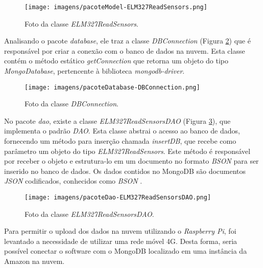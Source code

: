 \begin{figure}[!ht]
\centering
\caption{Foto da classe \textit{ELM327ReadSensors}.} 
{\texttt{[image: imagens/pacoteModel-ELM327ReadSensors.png]}}\\
 \label{Fig:elm327_read_sensors}
\end{figure}

Analisando o pacote \textit{database}, ele traz a classe \textit{DBConnection} (Figura \ref{Fig:db_connection}) que é responsável por criar a conexão com o banco de dados na nuvem. Esta classe contém o método estático \textit{getConnection} que retorna um objeto do tipo \textit{MongoDatabase}, pertencente à biblioteca \textit{mongodb-driver}.

\begin{figure}[!ht]
\centering
\caption{Foto da classe \textit{DBConnection}.} 
{\texttt{[image: imagens/pacoteDatabase-DBConnection.png]}}\\
 \label{Fig:db_connection}
\end{figure}

No pacote \textit{dao}, existe a classe \textit{ELM327ReadSensorsDAO} (Figura \ref{Fig:elm327_read_sensors_dao}), que implementa o padrão \textit{DAO}. Esta classe abstrai o acesso ao banco de dados, fornecendo um método para inserção chamada \textit{insertDB}, que recebe como parâmetro um objeto do tipo \textit{ELM327ReadSensors}. Este método é responsável por receber o objeto e estrutura-lo em um documento no formato \textit{BSON} para ser inserido no banco de dados. Os dados contidos no MongoDB são documentos \textit{JSON} codificados, conhecidos como \textit{BSON} \cite{mongodbjsonbson}.

\begin{figure}[!ht]
\centering
\caption{Foto da classe \textit{ELM327ReadSensorsDAO}.} 
{\texttt{[image: imagens/pacoteDao-ELM327ReadSensorsDAO.png]}}\\
 \label{Fig:elm327_read_sensors_dao}
\end{figure}

Para permitir o upload dos dados na nuvem utilizando o \textit{Raspberry Pi}, foi levantado a necessidade de utilizar uma rede móvel 4G. Desta forma, seria possível conectar o software com o MongoDB localizado em uma instância da Amazon na nuvem.

